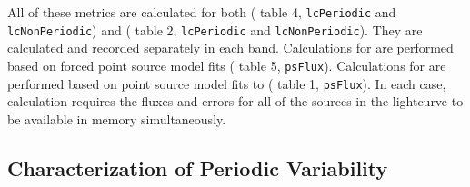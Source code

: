 \documentclass[DM,authoryear,toc]{lsstdoc}
\begin{document}
\begin{displayquote}
All of these metrics are calculated for both \Objects (\DPDD{} table 4, \texttt{lcPeriodic} and \texttt{lcNonPeriodic}) and \DIAObjects (\DPDD{} table 2, \texttt{lcPeriodic} and \texttt{lcNonPeriodic}). They are calculated and recorded separately in each band. Calculations for \Objects are performed based on forced point source model fits (\DPDD{} table 5, \texttt{psFlux}).  Calculations for \DIAObjects are performed based on point source model fits to \DIASources (\DPDD{} table 1, \texttt{psFlux}). In each case, calculation requires the fluxes and errors for all of the sources in the lightcurve to be available in memory simultaneously.


\subsection{Characterization of Periodic Variability}

\begin{itemize}


\end{itemize}
\end{displayquote}
\end{document}
